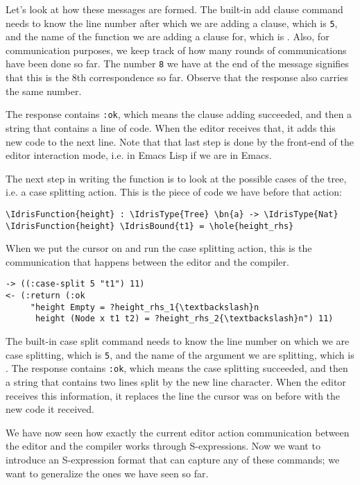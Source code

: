 Let's look at how these messages are formed. The built-in add clause command
needs to know the line number after which we are adding a clause, which is
\texttt{5}, and the name of the function we are adding a clause for, which is
.
Also, for communication purposes, we keep track of how many rounds of
communications have been done so far. The number \texttt{8} we have at the end
of the message signifies that this is the 8th correspondence so far.
Observe that the response also carries the same number.

The response contains \texttt{:ok}, which means the clause adding succeeded,
and then a string that contains a line of code.
When the editor receives that, it adds this new code to the next
line. Note that that last step is done by the front-end of the editor
interaction mode, i.e. in Emacs Lisp if we are in Emacs.

The next step in writing the function  is to look at the possible
cases of the tree, i.e. a case splitting action. This is the piece of code we
have before that action:

\begin{Verbatim}[framesep=2mm, label=\footnotesize{\normalfont{Idris}}, labelposition=topline]
\IdrisFunction{height} : \IdrisType{Tree} \bn{a} -> \IdrisType{Nat}
\IdrisFunction{height} \IdrisBound{t1} = \hole{height_rhs}
\end{Verbatim}

When we put the cursor on  and run the case splitting action, this is
the communication that happens between the editor and the compiler.

\begin{Verbatim}[framesep=2mm, label=\footnotesize{\normalfont{S-expression}}, labelposition=topline]
-> ((:case-split 5 "t1") 11)
<- (:return (:ok
     "height Empty = ?height_rhs_1{\textbackslash}n
      height (Node x t1 t2) = ?height_rhs_2{\textbackslash}n") 11)
\end{Verbatim}

The built-in case split command needs to know the line number on which we are
case splitting, which is \texttt{5}, and the name of the argument we are
splitting, which is .  The response contains \texttt{:ok}, which means
the case splitting succeeded, and then a string that contains two lines split
by the new line character. When the editor receives this information, it
replaces the line the cursor was on before with the new code it received.

We have now seen how exactly the current editor action communication between
the editor and the compiler works through S-expressions.
Now we want to introduce an S-expression format that can capture any of these
commands; we want to generalize the ones we have seen so far.

